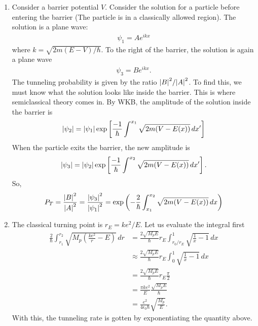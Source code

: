 \documentclass{article}
\theoremstyle{definition}
\newcommand{\f}[2]{\frac{#1}{#2}}
\newcommand{\lp}{\left(}
\newcommand{\rp}{\right)}
\newcommand{\lb}{\left[}
\newcommand{\rb}{\right]}
\begin{document}
\begin{enumerate}[label=(\alph*)]
	\item Consider a barrier potential $V$. Consider the solution for a particle before entering the barrier (The particle is in a classically allowed region). The solution is a plane wave:
	\begin{align*}
	\psi_1 =  Ae^{ikx}
	\end{align*}
	where $k=\sqrt{2m(E-V)/\hbar}$. To the right of the barrier, the solution is again a plane wave
	\begin{align*}
	\psi_3 = Be^{ikx}.
	\end{align*}
	The tunneling probability is given by the ratio $\abs{B}^2/\abs{A}^2$. To find this, we must know what the solution looks like inside the barrier. This is where semiclassical theory comes in. By WKB, the amplitude of the solution inside the barrier is
	\begin{align*}
	\abs{\psi_2} = \abs{\psi_1} \exp \lb \f{-1}{\hbar} \int^{x_1} \sqrt{2m(V-E(x))} \,dx' \rb
	\end{align*}
	When the particle exits the barrier, the new amplitude is 
	\begin{align*}
	\abs{\psi_3} = \abs{\psi_2} \exp \lb \f{-1}{\hbar} \int^{x_2} \sqrt{2m(V-E(x))} \,dx' \rb.
	\end{align*}
	So, 
	\begin{align*}
	P_T = \f{\abs{B}^2}{\abs{A}^2} = \f{\abs{\psi_3}^2}{\abs{\psi_1}^2} = \exp\lp -\f{2}{\hbar}\int_{x_1}^{x_2} \sqrt{2m(V-E(x))}\,dx \rp 
	\end{align*}
	
	
	
	\item The classical turning point is $r_E = k e^2/E $. Let us evaluate the integral first
	\begin{align*}
	\f{2}{\hbar}\int_{r_1}^{r_2} \sqrt{M_p \lp  \f{k e^2}{r} - E \rp}\,dr &= \f{2\sqrt{M_p E}}{\hbar} r_E   \int^1_{r_0/r_E} \sqrt{\f{1}{x} - 1}\,dx \\
	&\approx \f{2\sqrt{M_p E}}{\hbar} r_E   \int^1_{0} \sqrt{\f{1}{x} - 1}\,dx \\
	&=  \f{2\sqrt{M_p E}}{\hbar} r_E \f{\pi}{2} \\
	&= \f{\pi ke^2}{E} \f{\sqrt{M_p E}}{\hbar} \\
	&= \f{e^2}{4\epsilon_0 \hbar} \sqrt{\f{M_p}{E}}.
	\end{align*}
	With this, the tunneling rate is gotten by exponentiating the quantity above. 
	

\end{enumerate}
\end{document}
